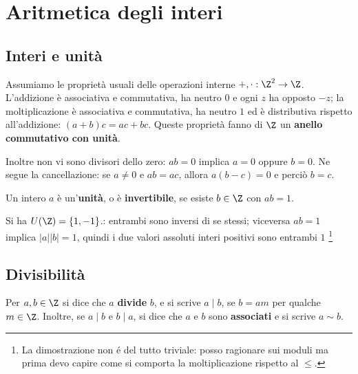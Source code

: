 \chapter{Aritmetica degli interi}\label{cap:interi}

\section{Interi e unità}
Assumiamo le proprietà usuali delle operazioni interne $+,\cdot:\Z^2\to\Z$. L'addizione è associativa e commutativa, ha neutro $0$ e ogni $z$ ha opposto $-z$; la moltiplicazione è associativa e commutativa, ha neutro $1$ ed è distributiva rispetto all'addizione: $(a+b)c=ac+bc$. Queste proprietà fanno di $\Z$ un \textbf{anello commutativo con unità}.

Inoltre non vi sono divisori dello zero: $ab=0$ implica $a=0$ oppure $b=0$. Ne segue la cancellazione: se $a\ne0$ e $ab=ac$, allora $a(b-c)=0$ e perciò $b=c$.

\begin{definizione}
Un intero $a$ è un'\textbf{unità}, o è \textbf{invertibile}, se esiste $b\in\Z$ con $ab=1$.
\end{definizione}

Si ha $U(\Z)=\{1,-1\}$.: entrambi sono inversi di se stessi; viceversa $ab=1$ implica $|a||b|=1$, quindi i due valori assoluti interi positivi sono entrambi $1$ \footnote{La dimostrazione non é del tutto triviale: posso ragionare sui moduli ma prima devo capire come si comporta la moltiplicazione rispetto al $\leq$.}

\section{Divisibilità}
\begin{definizione}
Per $a,b\in\Z$ si dice che $a$ \textbf{divide} $b$, e si scrive $a\mid b$, se $b=am$ per qualche $m\in\Z$. Inoltre, se $a\mid b$ e $b\mid a$, si dice che $a$ e $b$ sono \textbf{associati} e si scrive $a\sim b$.
\end{definizione}

